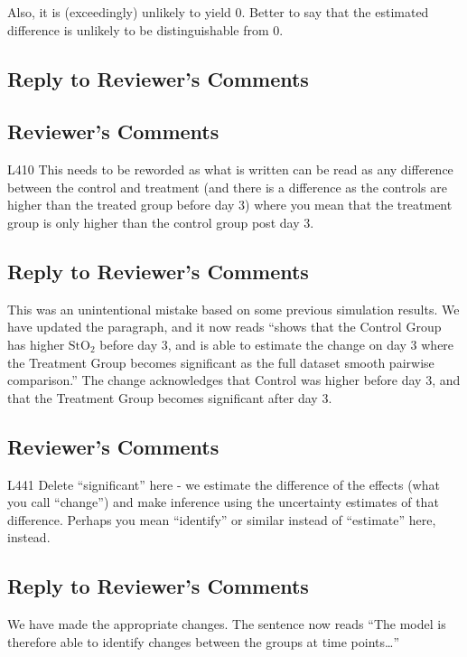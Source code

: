 \documentclass[
]{article}
\begin{document}
Also, it is (exceedingly) unlikely to yield 0. Better to say that the estimated difference is unlikely to be distinguishable from 0.

\hypertarget{section-36}{%
\subsection{\texorpdfstring{\textcolor{reviewersblue} {Reply to Reviewer's Comments}}{}}\label{section-36}}

\hypertarget{reviewers-comments-36}{%
\subsection{Reviewer's Comments}\label{reviewers-comments-36}}

L410 This needs to be reworded as what is written can be read as any difference between the control and treatment (and there is a difference as the controls are higher than the treated group before day 3) where you mean that the treatment group is only higher than the control group post day 3.

\hypertarget{section-37}{%
\subsection{\texorpdfstring{\textcolor{reviewersblue} {Reply to Reviewer's Comments}}{}}\label{section-37}}

This was an unintentional mistake based on some previous simulation results. We have updated the paragraph, and it now reads ``shows that the Control Group has higher \(\mbox{StO}_2\) before day 3, and is able to estimate the change on day 3 where the Treatment Group becomes significant as the full dataset smooth pairwise comparison.'' The change acknowledges that Control was higher before day 3, and that the Treatment Group becomes significant after day 3.

\hypertarget{reviewers-comments-37}{%
\subsection{Reviewer's Comments}\label{reviewers-comments-37}}

L441 Delete ``significant'' here - we estimate the difference of the effects (what you call ``change'') and make inference using the uncertainty estimates of that difference. Perhaps you mean ``identify'' or similar instead of ``estimate'' here, instead.

\hypertarget{section-38}{%
\subsection{\texorpdfstring{\textcolor{reviewersblue} {Reply to Reviewer's Comments}}{}}\label{section-38}}

We have made the appropriate changes. The sentence now reads ``The model is therefore able to identify changes between the groups at time points\ldots{}''
\end{document}
